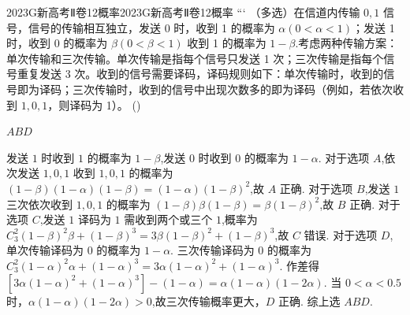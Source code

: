 \documentclass[12pt,UTF-8,a4paper]{ctexart}
\numberwithin{figure}{section}
\theoremstyle{mystyle}
\theoremstyle{mystylekaishu}
\theoremstyle{mystyle}
\numberwithin{xiti}{section}
\begin{document}

\begin{problem}{2023}{G}{新高考Ⅱ卷}{12}{概率}{2023}{G}{新高考Ⅱ卷}{12}{概率}
```
（多选）在信道内传输 $0,1$ 信号，信号的传输相互独立，发送 0 时，收到 1 的概率为 $\alpha(0<\alpha<1)$；发送 1 时，收到 0 的概率为 $\beta(0<\beta<1)$ 收到 1 的概率为 $1-\beta$.考虑两种传输方案：单次传输和三次传输。单次传输是指每个信号只发送 1 次；三次传输是指每个信号重复发送 3 次。收到的信号需要译码，译码规则如下：单次传输时，收到的信号即为译码；三次传输时，收到的信号中出现次数多的即为译码（例如，若依次收到 $1,0,1$，则译码为 1）。 (\hspace{1cm})
\begin{choices}
\end{choices}
\end{problem}

\begin{answer}
$ABD$
\end{answer}

\begin{solutions}
发送 $1$ 时收到 $1$ 的概率为 $1-\beta$,发送 $0$ 时收到 $0$ 的概率为 $1-\alpha$.
对于选项 $A$,依次发送 $1,0,1$ 收到 $1,0,1$ 的概率为 $(1-\beta)(1-\alpha)(1-\beta)=(1-\alpha)(1-\beta)^{2}$,故 $A$ 正确.
对于选项 $B$,发送 $1$ 三次依次收到 $1,0,1$ 的概率为 $(1-\beta)\beta(1-\beta)=\beta(1-\beta)^{2}$,故 $B$ 正确.
对于选项 $C$,发送 $1$ 译码为 $1$ 需收到两个或三个 $1$,概率为 $C_{3}^{2}(1-\beta)^{2}\beta+(1-\beta)^{3}=3\beta(1-\beta)^{2}+(1-\beta)^{3}$,故 $C$ 错误.
对于选项 $D$,单次传输译码为 $0$ 的概率为 $1-\alpha$. 三次传输译码为 $0$ 的概率为 $C_{3}^{2}(1-\alpha)^{2}\alpha+(1-\alpha)^{3}=3\alpha(1-\alpha)^{2}+(1-\alpha)^{3}$.
作差得 $[3\alpha(1-\alpha)^{2}+(1-\alpha)^{3}]-(1-\alpha)=\alpha(1-\alpha)(1-2\alpha)$.
当 $0<\alpha<0.5$ 时，$\alpha(1-\alpha)(1-2\alpha)>0$,故三次传输概率更大，$D$ 正确.
综上选 $ABD$.
\end{solutions}

\end{document}
